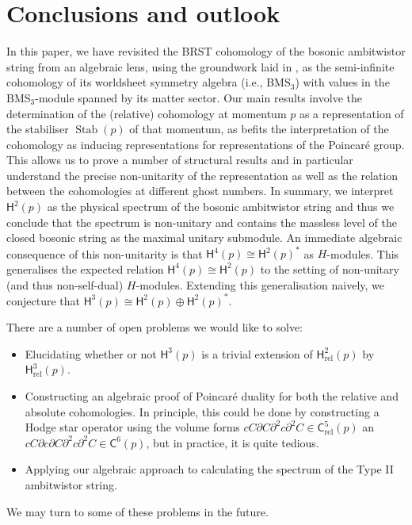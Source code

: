 \documentclass[11pt,reqno,a4paper,final]{amsart}
\theoremstyle{plain}
\theoremstyle{definition}
\renewcommand{\d}{\partial}
\newcommand{\sC}{\mathsf{C}}
\newcommand{\sH}{\mathsf{H}}
\newcommand{\Crel}{\mathsf{C}_{\mathrm{rel}}} %
\newcommand{\Hrel}{\mathsf{H}_{\mathrm{rel}}}
\newcommand{\Stab}{\operatorname{Stab}}
\newcommand{\1}{\mathbb{1}}
\numberwithin{equation}{section}
\begin{document}
\section{Conclusions and outlook}
\label{sec:conclusions-outlook}

In this paper, we have revisited the BRST cohomology of the bosonic ambitwistor string 
from an algebraic lens, using the groundwork laid in \cite{Figueroa-OFarrill:2024wgs}, as the semi-infinite cohomology of its worldsheet symmetry algebra (i.e., BMS$_3$)
with values in the BMS$_3$-module spanned by its matter sector. 
Our main results
involve the determination of the (relative) cohomology at momentum $p$
as a representation of the stabiliser $\Stab(p)$ of that momentum, as
befits the interpretation of the cohomology as inducing
representations for representations of the Poincaré group.  This
allows us to prove a number of structural results and in particular
understand the precise non-unitarity of the representation as well as
the relation between the cohomologies at different ghost numbers.  In
summary, we interpret $\sH^2(p)$ as the physical spectrum of the
bosonic ambitwistor string and thus we conclude that the spectrum is
non-unitary and contains the massless level of the closed bosonic
string as the maximal unitary submodule.  An immediate algebraic
consequence of this non-unitarity is that $\sH^4(p) \cong \sH^2(p)^*$
as $H$-modules. This generalises the expected relation
$\sH^4(p) \cong \sH^2(p)$ to the setting of non-unitary (and thus
non-self-dual) $H$-modules. Extending this generalisation naively, we
conjecture that $\sH^3(p) \cong \sH^2(p) \oplus \sH^2(p)^*$.

There are a number of open problems we would like to solve:
\begin{itemize}
\item Elucidating whether or not $\sH^3(p)$ is a trivial extension of
  $\Hrel^2(p)$ by $\Hrel^3(p)$.
\item Constructing an algebraic proof of Poincaré duality for both the relative and
  absolute cohomologies. In principle, this could be done by
  constructing a Hodge star operator using the volume forms $cC\d C
  \d^2 c \d^2 C \in \Crel^5(p)$ an $c C \d c \d C \d^2 c \d^2 C \in
  \sC^6(p)$, but in practice, it is quite tedious.
\item Applying our algebraic approach to calculating the spectrum of the
  Type II ambitwistor string.
\end{itemize}
We may turn to some of these problems in the future.
\end{document}
